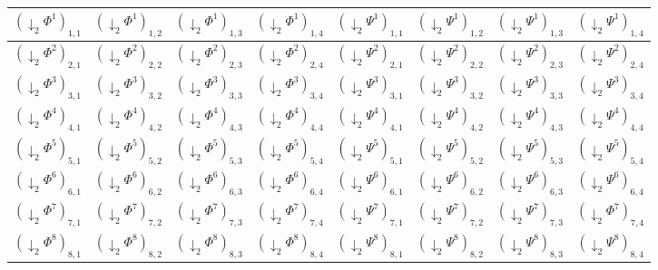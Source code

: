 \documentclass[a4paper,10pt]{report}
\theoremstyle{break}
\begin{document}
	
	\begin{center}
	
	  \begin{tabular}{| c | c | c | c || c | c | c | c |}
	      \hline
	      $(\downarrow_2 \varPhi^1)_{1,1}$ & $(\downarrow_2 \varPhi^1)_{1,2}$ & $(\downarrow_2 \varPhi^1)_{1,3}$ & $(\downarrow_2 \varPhi^1)_{1,4}$ 
	      & $(\downarrow_2 \varPsi^1)_{1,1}$ & $(\downarrow_2 \varPsi^1)_{1,2}$ & $(\downarrow_2 \varPsi^1)_{1,3}$ & $(\downarrow_2 \varPsi^1)_{1,4}$ \\ 
	      \hline
	      $(\downarrow_2 \varPhi^2)_{2,1}$ & $(\downarrow_2 \varPhi^2)_{2,2}$ & $(\downarrow_2 \varPhi^2)_{2,3}$ & $(\downarrow_2 \varPhi^2)_{2,4}$ 
	      & $(\downarrow_2 \varPsi^2)_{2,1}$ & $(\downarrow_2 \varPsi^2)_{2,2}$ & $(\downarrow_2 \varPsi^2)_{2,3}$ & $(\downarrow_2 \varPsi^2)_{2,4}$ \\ 
	      \hline
	      $(\downarrow_2 \varPhi^3)_{3,1}$ & $(\downarrow_2 \varPhi^3)_{3,2}$ & $(\downarrow_2 \varPhi^3)_{3,3}$ & $(\downarrow_2 \varPhi^3)_{3,4}$ 
	      & $(\downarrow_2 \varPsi^3)_{3,1}$ & $(\downarrow_2 \varPsi^3)_{3,2}$ & $(\downarrow_2 \varPsi^3)_{3,3}$ & $(\downarrow_2 \varPsi^3)_{3,4}$ \\ 
	      \hline
	      $(\downarrow_2 \varPhi^4)_{4,1}$ & $(\downarrow_2 \varPhi^4)_{4,2}$ & $(\downarrow_2 \varPhi^4)_{4,3}$ & $(\downarrow_2 \varPhi^4)_{4,4}$ 
	      & $(\downarrow_2 \varPsi^4)_{4,1}$ & $(\downarrow_2 \varPsi^4)_{4,2}$ & $(\downarrow_2 \varPsi^4)_{4,3}$ & $(\downarrow_2 \varPsi^4)_{4,4}$ \\ 
	      \hline
	      $(\downarrow_2 \varPhi^5)_{5,1}$ & $(\downarrow_2 \varPhi^5)_{5,2}$ & $(\downarrow_2 \varPhi^5)_{5,3}$ & $(\downarrow_2 \varPhi^5)_{5,4}$ 
	      & $(\downarrow_2 \varPsi^5)_{5,1}$ & $(\downarrow_2 \varPsi^5)_{5,2}$ & $(\downarrow_2 \varPsi^5)_{5,3}$ & $(\downarrow_2 \varPsi^5)_{5,4}$ \\ 
	      \hline
	      $(\downarrow_2 \varPhi^6)_{6,1}$ & $(\downarrow_2 \varPhi^6)_{6,2}$ & $(\downarrow_2 \varPhi^6)_{6,3}$ & $(\downarrow_2 \varPhi^6)_{6,4}$ 
	      & $(\downarrow_2 \varPsi^6)_{6,1}$ & $(\downarrow_2 \varPsi^6)_{6,2}$ & $(\downarrow_2 \varPsi^6)_{6,3}$ & $(\downarrow_2 \varPsi^6)_{6,4}$ \\ 
	      \hline
	      $(\downarrow_2 \varPhi^7)_{7,1}$ & $(\downarrow_2 \varPhi^7)_{7,2}$ & $(\downarrow_2 \varPhi^7)_{7,3}$ & $(\downarrow_2 \varPhi^7)_{7,4}$ 
	      & $(\downarrow_2 \varPsi^7)_{7,1}$ & $(\downarrow_2 \varPsi^7)_{7,2}$ & $(\downarrow_2 \varPsi^7)_{7,3}$ & $(\downarrow_2 \varPhi^7)_{7,4}$ \\ 
	      \hline
	      $(\downarrow_2 \varPhi^8)_{8,1}$ & $(\downarrow_2 \varPhi^8)_{8,2}$ & $(\downarrow_2 \varPhi^8)_{8,3}$ & $(\downarrow_2 \varPhi^8)_{8,4}$ 
	      & $(\downarrow_2 \varPsi^8)_{8,1}$ & $(\downarrow_2 \varPsi^8)_{8,2}$ & $(\downarrow_2 \varPsi^8)_{8,3}$ & $(\downarrow_2 \varPsi^8)_{8,4}$ \\  
	      \hline
	  \end{tabular}
	 
	\end{center}
	
\end{document}
